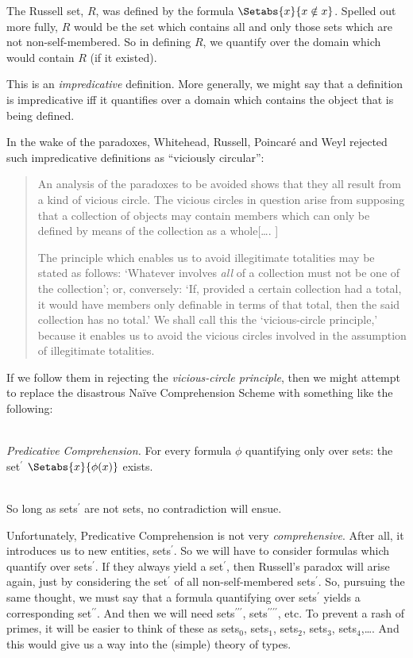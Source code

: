 \documentclass[../../../include/open-logic-section]{subfiles}
\begin{document}
The Russell set, $R$, was defined by the formula $\Setabs{x}{x \notin x}$. Spelled out more fully, $R$ would be the set which contains all and only those sets which are not non-self-membered. So in defining $R$, we quantify over the domain which would contain $R$ (if it existed).

This is an \emph{impredicative} definition. More generally, we might say that a definition is impredicative iff it quantifies over a domain which contains the object that is being defined.  
	
In the wake of the paradoxes, Whitehead, Russell, Poincar\'{e} and Weyl rejected such impredicative definitions as ``viciously circular'':
	\begin{quote}
		An analysis of the paradoxes to be avoided shows that they all result from a kind of vicious circle. The vicious circles in question arise from supposing that a collection of objects may contain members which can only be defined by means of the collection as a whole[\ldots. \textparagraph]
		
		The principle which enables us to avoid illegitimate totalities may be stated as follows: `Whatever involves \emph{all} of a collection must not be one of the collection'; or, conversely: `If, provided a certain collection had a total, it would have members only definable in terms of that total, then the said collection has no total.' We shall call this the `vicious-circle principle,' because it enables us to avoid the vicious circles involved in the assumption of illegitimate totalities. \citep[37]{WhiteheadRussell1910}
	\end{quote}
If we follow them in rejecting the \emph{vicious-circle principle}, then we might attempt to replace the disastrous Na\"{i}ve Comprehension Scheme with something like the following:
	
	\
	\\\emph{Predicative Comprehension.} For every formula $\phi$ quantifying only over sets: the set$^\prime$ $\Setabs{x}{\phi(x)}$ exists.
	
\
\\So long as sets$^{\prime}$ are not sets, no contradiction will ensue.  
	
Unfortunately, Predicative Comprehension is not very \emph{comprehensive}. After all, it introduces us to new entities, sets$^\prime$. So we will have to consider formulas which quantify over sets$^\prime$. If they always yield a set$^\prime$, then Russell's paradox will arise again, just by considering the set$^\prime$ of all non-self-membered sets$^\prime$. So, pursuing the same thought, we must say that a formula quantifying over sets$^\prime$ yields a corresponding set$^{\prime\prime}$. And then we will need sets$^{\prime\prime\prime}$, sets$^{\prime\prime\prime\prime}$, etc. To prevent a rash of primes, it will be easier to think of these as sets$_0$, sets$_1$, sets$_2$, sets$_3$, sets$_4$,\ldots. And this would give us a way into the (simple) theory of types. 
\end{document}
